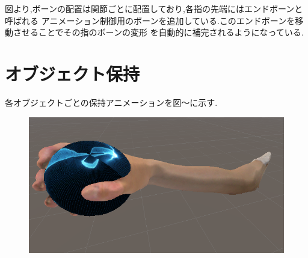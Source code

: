 \documentclass{ltjsreport}
\begin{document}
		図より,ボーンの配置は関節ごとに配置しており,各指の先端にはエンドボーンと呼ばれる
		アニメーション制御用のボーンを追加している.このエンドボーンを移動させることでその指のボーンの変形
		を自動的に補完されるようになっている.
\clearpage
	\section{オブジェクト保持}
		各オブジェクトごとの保持アニメーションを図〜に示す.

		\begin{figure}[H]
		\centering
		\begin{minipage}{0.4\columnwidth}
		\centering
		\includegraphics[width = \columnwidth]{../figs/grapsphere_side.png}
		\end{minipage}
		\hspace{0.04\columnwidth}
		\begin{minipage}{0.18\columnwidth}
		\centering

\end{minipage}
\end{figure}
\end{document}
